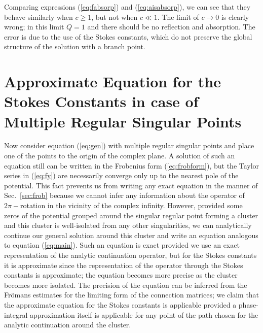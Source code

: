 \documentclass{ws-m3as}
\newcommand\eref[1]{(\ref{#1})}
\newcommand\sref[1]{Sec.~\ref{#1}}
\begin{document}
Comparing expressions \eref{eq:fabsorp} and \eref{eq:aisabsorp}, we can see that 
they behave similarly when $c \geq 1$, 
but not when $c \ll 1$. The limit of $c\rightarrow 0$ is clearly wrong; in this limit $Q=1$
and there should be no reflection and absorption. The error is due to the use of the Stokes constants, 
which do not preserve the global structure of the solution with a branch point. 

\section{Approximate Equation for the Stokes Constants in case of Multiple Regular Singular Points \label{sec:approx}}

Now consider equation \eref{eq:gen} with multiple regular singular points and place one of the points
to the origin of the complex plane. A solution of such an equation still can be written in
the Frobenius form \eref{eq:frobform}, but the Taylor series in \eref{eq:fy}
are necessarily converge only up to the nearest pole of the potential\cite{cbbook}. This fact
prevents us from writing any exact equation in the manner of \sref{sec:frob} because
we cannot infer any information about the operator of $2\pi-$rotation in the vicinity of the complex infinity. 
However, provided some zeros of the potential grouped around the singular regular point forming a cluster and 
this cluster is well-isolated from any other singularities, we can analytically continue our general solution
around this cluster and write an equation analogous to equation \eref{eq:main}. Such an equation
is exact provided we use an exact representation of the analytic continuation operator, but
for the Stokes constants it is approximate since the representation of the operator
through the Stokes constants is approximate; the equation becomes more precise as the cluster
becomes more isolated. The precision of the equation can be inferred from the Fr\"omans estimates 
for the limiting form of the connection matrices\cite{frbook}; we claim that the approximate equation 
for the Stokes constants is applicable provided a phase-integral approximation itself is applicable 
for any point of the path chosen for the analytic continuation around the cluster.
 
\end{document}
